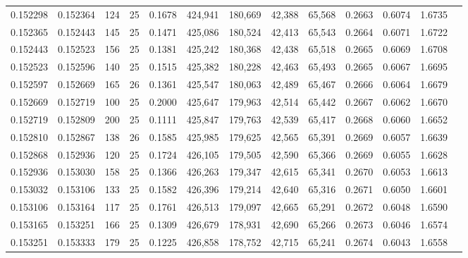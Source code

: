 \begin{tabular}{rrrrrrrrrrrrr}
0.152298 & 0.152364 &   124 &  25 &                                     0.1678 & 424,941 & 180,669 &  42,388 &  65,568 & 0.2663 & 0.6074 & 1.6735 \\
0.152365 & 0.152443 &   145 &  25 &                                     0.1471 & 425,086 & 180,524 &  42,413 &  65,543 & 0.2664 & 0.6071 & 1.6722 \\
0.152443 & 0.152523 &   156 &  25 &                                     0.1381 & 425,242 & 180,368 &  42,438 &  65,518 & 0.2665 & 0.6069 & 1.6708 \\
0.152523 & 0.152596 &   140 &  25 &                                     0.1515 & 425,382 & 180,228 &  42,463 &  65,493 & 0.2665 & 0.6067 & 1.6695 \\
0.152597 & 0.152669 &   165 &  26 &                                     0.1361 & 425,547 & 180,063 &  42,489 &  65,467 & 0.2666 & 0.6064 & 1.6679 \\
0.152669 & 0.152719 &   100 &  25 &                                     0.2000 & 425,647 & 179,963 &  42,514 &  65,442 & 0.2667 & 0.6062 & 1.6670 \\
0.152719 & 0.152809 &   200 &  25 &                                     0.1111 & 425,847 & 179,763 &  42,539 &  65,417 & 0.2668 & 0.6060 & 1.6652 \\
0.152810 & 0.152867 &   138 &  26 &                                     0.1585 & 425,985 & 179,625 &  42,565 &  65,391 & 0.2669 & 0.6057 & 1.6639 \\
0.152868 & 0.152936 &   120 &  25 &                                     0.1724 & 426,105 & 179,505 &  42,590 &  65,366 & 0.2669 & 0.6055 & 1.6628 \\
0.152936 & 0.153030 &   158 &  25 &                                     0.1366 & 426,263 & 179,347 &  42,615 &  65,341 & 0.2670 & 0.6053 & 1.6613 \\
0.153032 & 0.153106 &   133 &  25 &                                     0.1582 & 426,396 & 179,214 &  42,640 &  65,316 & 0.2671 & 0.6050 & 1.6601 \\
0.153106 & 0.153164 &   117 &  25 &                                     0.1761 & 426,513 & 179,097 &  42,665 &  65,291 & 0.2672 & 0.6048 & 1.6590 \\
0.153165 & 0.153251 &   166 &  25 &                                     0.1309 & 426,679 & 178,931 &  42,690 &  65,266 & 0.2673 & 0.6046 & 1.6574 \\
0.153251 & 0.153333 &   179 &  25 &                                     0.1225 & 426,858 & 178,752 &  42,715 &  65,241 & 0.2674 & 0.6043 & 1.6558 \\

\end{tabular}
